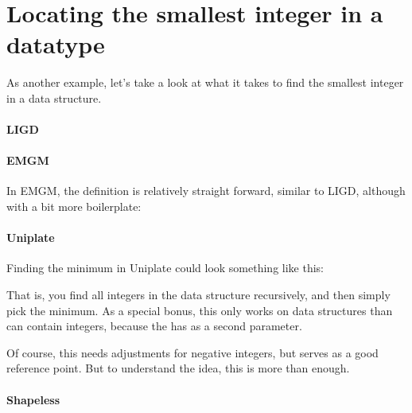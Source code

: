 \section{Locating the smallest integer in a datatype}
As another example, let's take a look at what it takes to find the smallest
integer in a data structure.

\paragraph{LIGD}

\paragraph{EMGM} In EMGM, the definition is relatively straight forward, similar
to LIGD, although with a bit more boilerplate:



\paragraph{Uniplate}

Finding the minimum in Uniplate could look something like this:



That is, you find all integers in the data structure recursively, and then
simply pick the minimum. As a special bonus, this only works on data structures
than can contain integers, because the  has  as a second
parameter.

Of course, this needs adjustments for negative integers, but serves as a good
reference point. But to understand the idea, this is more than enough.
\paragraph{Shapeless}
